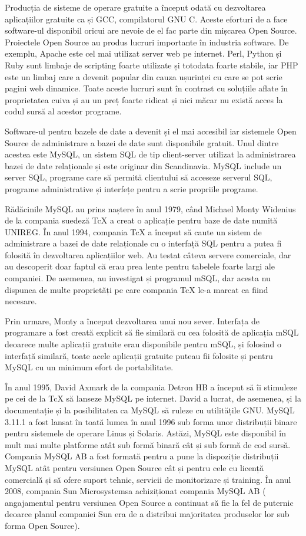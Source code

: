 \documentclass[12pt]{book}
\begin{document}
Producția de sisteme de operare gratuite a început odată cu dezvoltarea aplicațiilor gratuite ca și GCC, compilatorul GNU C. Aceste eforturi de a face software-ul disponibil oricui are nevoie de el fac parte din mișcarea Open Source. Proiectele Open Source au produs lucruri importante în industria software. De exemplu, Apache este cel mai utilizat server web pe internet. Perl, Python și Ruby sunt limbaje de scripting foarte utilizate și totodata foarte stabile, iar PHP este un limbaj care a devenit popular din cauza ușurinței cu care se pot scrie pagini web dinamice. Toate aceste lucruri sunt în contrast cu soluțiile aflate în proprietatea cuiva și au un preț foarte ridicat și nici măcar nu există acces la codul sursă al acestor programe.

Software-ul pentru bazele de date a devenit și el mai accesibil iar sistemele Open Source de administrare a bazei de date sunt disponibile gratuit. Unul dintre acestea este MySQL, un sistem SQL de tip client-server utilizat la administrarea bazei de date relaționale și este originar din Scandinavia. MySQL include un server SQL, programe care să permită clientului să acceseze serverul SQL, programe administrative și interfețe pentru a scrie propriile programe.\cite{mySqlDeveloperLibrary}

Rădăcinile MySQL au prins naștere în anul 1979, când Michael Monty Widenius de la compania suedeză TcX a creat o aplicație pentru baze de date numită UNIREG. În anul 1994, compania TcX a început să caute un sistem de administrare a bazei de date relaționale cu o interfață SQL pentru a putea fi folosită în dezvoltarea aplicațiilor web. Au testat câteva servere comerciale, dar au descoperit doar faptul că erau prea lente  pentru tabelele foarte largi ale companiei. De asemenea, au investigat și programul mSQL, dar acesta nu dispunea de multe proprietăți pe care compania TcX le-a marcat ca fiind necesare. 

Prin urmare, Monty a început dezvoltarea unui nou sever. Interfața de programare a fost creată explicit să fie similară cu cea folosită de aplicația mSQL deoarece multe aplicații gratuite erau disponibile pentru mSQL, și folosind o interfață similară, toate acele aplicații gratuite puteau fii folosite și pentru MySQL cu un minimum efort de portabilitate. 

În anul 1995, David Axmark de la compania Detron HB a început să îi stimuleze pe cei de la TcX să lanseze MySQL pe internet. David a lucrat, de asemenea, și la documentație și la posibilitatea ca MySQL să ruleze cu utilitățile GNU. MySQL 3.11.1 a fost lansat în toată lumea în anul 1996 sub forma unor distribuții binare pentru sistemele de operare Linus și Solaris. Astăzi, MySQL este disponibil în mult mai multe platforme atât sub formă binară cât și sub formă de cod sursă. Compania MySQL AB a fost formată pentru a pune la dispoziție distribuții MySQL atât pentru versiunea Open Source cât și pentru cele cu licență comercială și să ofere suport tehnic, servicii de monitorizare și training. În anul 2008, compania Sun Microsystemsa achiziționat compania MySQL AB ( angajamentul pentru versiunea Open Source a continuat să fie la fel de puternic deoarce planul companiei Sun era de a distribui majoritatea produselor lor sub forma Open Source).
\end{document}
